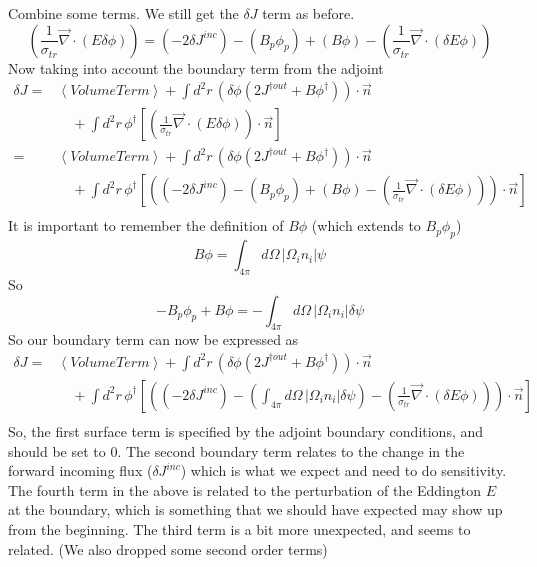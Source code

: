 \documentclass{article}
\newcommand{\bra}{\left\langle}
\newcommand{\ket}{\right\rangle}
\newcommand{\vdiv}{\vec{\nabla} \cdot}
\begin{document}
Combine some terms. We still get the $\delta J $ term as before.
\[
\left( \frac{1}{\sigma_{tr}} \vdiv \left(  E \delta \phi \right) \right) = (-2\delta J^{inc}) - (B_p \phi_p) + (B \phi)  - \left( \frac{1}{\sigma_{tr}} \vdiv \left( \delta E \phi  \right) \right)
\]
Now taking into account the boundary term from the adjoint
\begin{align*}
\delta J =& \bra VolumeTerm \ket + \int d^2 r \, \left(\delta \phi \left( 2J^{ \dag out } + B \phi^\dag \right) \right) \cdot \vec{n} \\
& \quad + \int d^2 r \, \phi^\dag \left[ \left( \frac{1}{\sigma_{tr}} \vdiv \left( E \delta \phi \right) \right) \cdot \vec{n} \right] \\
=& \bra VolumeTerm \ket + \int d^2 r \, \left(\delta \phi \left( 2J^{ \dag out } + B \phi^\dag \right) \right) \cdot \vec{n} \\
& \quad + \int d^2 r \, \phi^\dag \left[ \left( (-2\delta J^{inc}) - (B_p \phi_p) + (B \phi)  - \left( \frac{1}{\sigma_{tr}} \vdiv \left( \delta E \phi  \right) \right) \right) \cdot \vec{n} \right] \\
\end{align*}
It is important to remember the definition of $B \phi$ (which extends to $B_p \phi_p$)
\[ B \phi = \int_{4 \pi} d\Omega \, \left| \Omega_i n_i \right | \psi
\]
So 
\[
-B_p \phi_p + B \phi = - \int_{4 \pi} d\Omega \, \left| \Omega_i n_i \right | \delta \psi
\]
So our boundary term can now be expressed as
\begin{align*}
\delta J =& \bra VolumeTerm \ket + \int d^2 r \, \left(\delta \phi \left( 2J^{ \dag out } + B \phi^\dag \right) \right) \cdot \vec{n} \\
& \quad + \int d^2 r \, \phi^\dag \left[ \left( (-2\delta J^{inc}) - \left( \int_{4 \pi} d\Omega \, \left| \Omega_i n_i \right | \delta \psi \right)  - \left( \frac{1}{\sigma_{tr}} \vdiv \left( \delta E \phi  \right) \right) \right) \cdot \vec{n} \right] \\
\end{align*}
So, the first surface term is specified by the adjoint boundary conditions, and should be set to 0. The second boundary term relates to the change in the forward incoming flux ($\delta J^{inc}$) which is what we expect and need to do sensitivity. The fourth term in the above is related to the perturbation of the Eddington $E$ at the boundary, which is something that we should have expected may show up from the beginning. The third term is a bit more unexpected, and seems to related. (We also dropped some second order terms)
\end{document}
